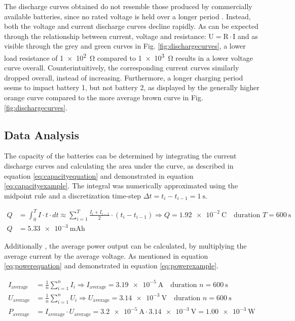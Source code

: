 The discharge curves obtained do not resemble those produced by commercially available batteries, since no rated voltage is held over a longer period \cite{Panasonic2018}. Instead, both the voltage and current discharge curves decline rapidly. 
As can be expected through the relationship between current, voltage and resistance: $\mathrm{U}=\mathrm{R} \cdot \mathrm{I}$ and as visible through the grey and green curves in Fig. \ref{fig:dischargecurves}, a lower load resistance of \SI{1e2}{\ohm} compared to \SI{1e3}{\ohm} results in a lower voltage curve overall.
Counterintuitively, the corresponding current curves similarly dropped overall, instead of increasing.
Furthermore, a longer charging period seems to impact battery 1, but not battery 2, as displayed by the generally higher orange curve compared to the more average brown curve in Fig. \ref{fig:dischargecurves}.

\newpage

\subsection{Data Analysis}
The capacity of the batteries can be determined by integrating the current discharge curves and calculating the area under the curve, as described in equation \ref{eq:capacityequation} and demonstrated in equation \ref{eq:capacityexample}. The integral was numerically approximated using the midpoint rule and a discretization time-step $\Delta t = t_i - t_{i-1} = \SI{1}{\second}$\cite{Kammer2019}.

\begin{align}\label{eq:capacityexample}
    Q &= \int_0^T I \cdot t \cdot d t \approx \sum_{i=1}^{T} \frac{I_i + I_{i-1}}{2} \cdot (t_{i}-t_{i-1}) \Rightarrow Q = \SI{1.92e-2}{\coulomb} \quad \text{duration } T = \SI{600}{\second}\\
    Q &= \SI{5.33e-3}{\mA\hour}
\end{align}


Additionally , the average power output can be calculated, by multiplying the average current by the average voltage. As mentioned in equation \ref{eq:powerequation} and demonstrated in equation \ref{eq:powerexample}.

\begin{align}\label{eq:powerexample}
    I_\text{average} &= \frac{1}{n}\sum_{i=1}^{n} I_i \Rightarrow I_\text{average} = \SI{3.19e-5}{\ampere} \quad \text{duration } n = \SI{600}{\second}\\
    U_\text{average} &= \frac{1}{n}\sum_{i=1}^{n} U_i \Rightarrow U_\text{average} = \SI{3.14e-3}{\volt} \quad \text{duration } n = \SI{600}{\second}\\
    P_\text{average} &= I_{\text{average}} \cdot  U_\text{average} = \SI{3.2e-5}{\ampere} \cdot \SI{3.14e-3}{\volt} = \SI{1.00e-3}{\watt}\\
\end{align}

